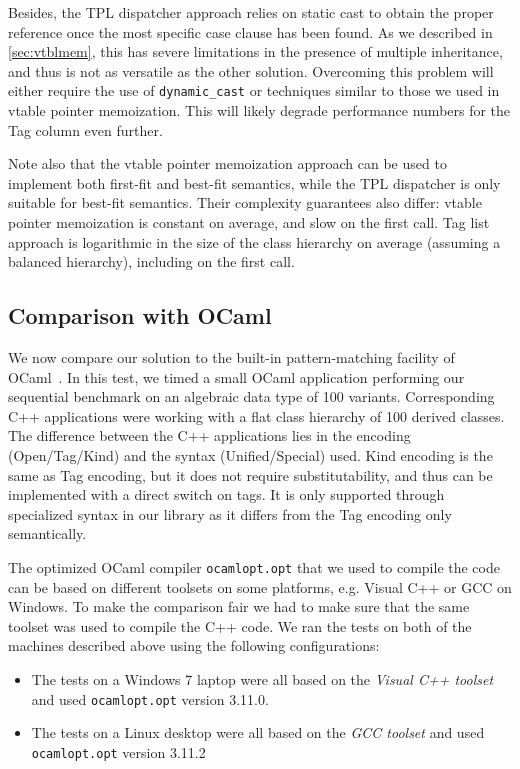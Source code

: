 \documentclass[preprint]{sigplanconf}
\makeatletter
\DeclareRobustCommand{\code}[1]{{\lstinline[breaklines=false,escapechar=@]{#1}}}
\makeatother
\begin{document}
Besides, the TPL dispatcher approach relies on static cast to obtain the 
proper reference once the most specific case clause has been found. As we 
described in \textsection\ref{sec:vtblmem}, this has severe limitations in the 
presence of multiple inheritance, and thus is not as versatile as the other 
solution. Overcoming this problem will either require the use of 
\code{dynamic_cast} or techniques similar to those we used in vtable pointer 
memoization. This will likely degrade performance numbers for the Tag column even further.

Note also that the vtable pointer memoization approach can be used to implement both
first-fit and best-fit semantics, while the TPL dispatcher is only suitable 
for best-fit semantics. Their complexity guarantees also differ: vtable pointer 
memoization is constant on average, and slow on the first call. Tag list approach is 
logarithmic in the size of the class hierarchy on average (assuming a balanced 
hierarchy), including on the first call.

\subsection{Comparison with OCaml}
\label{sec:ocaml}

We now compare our solution to the built-in pattern-matching facility of OCaml~\cite{OPM01}. 
In this test, we timed a small OCaml application performing our sequential 
benchmark on an algebraic data type of 100 variants. Corresponding C++ 
applications were working with a flat class hierarchy of 100 derived classes. 
The difference between the C++ applications lies in the encoding (Open/Tag/Kind) 
and the syntax (Unified/Special) used. Kind encoding is the same as Tag encoding, but 
it does not require substitutability, and thus can be implemented with a direct 
switch on tags. It is only supported through specialized syntax in our library 
as it differs from the Tag encoding only semantically.

The optimized OCaml compiler \texttt{ocamlopt.opt} that we used to compile the code 
can be based on different toolsets on some platforms, e.g. Visual C++ or GCC 
on Windows. To make the comparison fair we had to make sure that the 
same toolset was used to compile the C++ code. We ran the tests 
on both of the machines described above using the following configurations: 

\begin{itemize}
\setlength{\itemsep}{0pt}
\setlength{\parskip}{0pt}
\item The tests on a Windows 7 laptop were all based on the \emph{Visual C++ toolset} 
      and used \texttt{ocamlopt.opt} version 3.11.0.
\item The tests on a Linux desktop were all based on the \emph{GCC toolset} and used 
      \texttt{ocamlopt.opt} version 3.11.2
\end{itemize}
\end{document}
